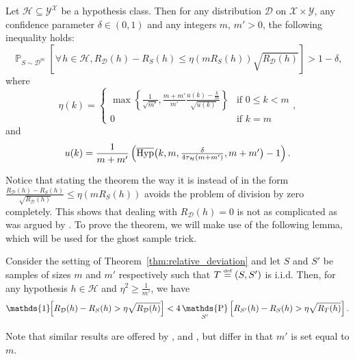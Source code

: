 \documentclass[twoside,11pt]{article}
\newcommand{\Id}[1]{\mathds{1}\hspace{-2.5pt}\left[#1\right]}
\let\oldforall=\forall
\renewcommand{\forall}{\hspace{1pt}\oldforall\hspace{1pt}}
\newcommand{\pr}[1]{\left(#1\right)}
\newcommand{\cb}[1]{\left\{#1\right\}}
\newcommand{\D}{\mathcal{D}}
\renewcommand{\H}{{\mathcal{H}}}
\newcommand{\eqdef}{\overset{\smash{\mbox{\tiny \rm def}}}{=}}
\DeclareMathOperator*{\Prob}{\mathds{P}}
\newcommand{\prob}[2]{\Prob_{#1}\left[#2\right]}
\newcommand{\HypInv}{\overline{\textnormal{Hyp}}}
\begin{document}
\begin{theorem}
\label{thm:relative_deviation}
Let $\H \subseteq \mathcal{Y}^\mathcal{X}$ be a hypothesis class.
Then for any distribution $\D$ on $\mathcal{X} \times \mathcal{Y}$, any confidence parameter $\delta \in (0, 1)$ and any integers $m$, $m'>0$, the following inequality holds:
\begin{equation*}
\prob{S\sim\D^m}{\forall h \in \H, R_\D(h) - R_S(h) \leq \eta(m R_S(h)) \sqrt{R_\D(h)}} > 1 - \delta,
\end{equation*}
where
\begin{equation*}
\eta(k) = \begin{cases}
    \max\cb{ \frac{1}{\sqrt{m'}}, \frac{m+m'}{m'} \frac{u(k) - \frac{k}{m}}{\sqrt{u(k)}}  } & \text{if } 0 \leq k < m \\
    0 & \text{if } k = m
\end{cases},
\end{equation*}
and
\begin{equation*}
    u(k) = \frac{1}{m+m'}\pr{ \HypInv\big(k, m, \textstyle\frac{\delta}{4 \tau_\H(m + m')}, m + m'\big) - 1}.
\end{equation*}
\end{theorem}

Notice that stating the theorem the way it is instead of in the form $\frac{R_\D(h) - R_S(h)}{\sqrt{R_\D(h)}} \le \eta(m R_S(h))$ avoids the problem of division by zero completely.
This shows that dealing with $R_\D(h) = 0$ is not as complicated as was argued by \cite{cortes2019relative}.
To prove the theorem, we will make use of the following lemma, which will be used for the ghost sample trick.

\begin{lemma}\label{lem:rel_dev}
Consider the setting of Theorem~\ref{thm:relative_deviation} and let $S$ and $S'$ be samples of sizes $m$ and $m'$ respectively such that $T \eqdef (S, S')$ is i.i.d.
Then, for any hypothesis $h\in\H$ and $\eta^2 \geq \frac{1}{m'}$, we have
\begin{equation*}
\Id{R_\D(h) - R_S(h) > \eta \sqrt{R_\D(h)}}
    < 4\prob{S'}{R_{S'}(h) - R_S(h) > \eta \sqrt{R_T(h)}}.
\end{equation*}
\end{lemma}

Note that similar results are offered by \cite{vapnik98}, \cite{as-93} and \cite{cortes2019relative}, but differ in that $m'$ is set equal to $m$.
\end{document}
